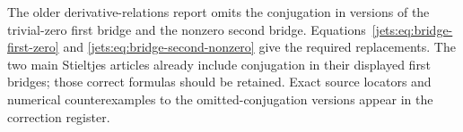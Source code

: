 \begin{remark}
The older derivative-relations report omits the conjugation
in versions of the trivial-zero first bridge and the nonzero
second bridge. Equations~\eqref{jets:eq:bridge-first-zero} and
\eqref{jets:eq:bridge-second-nonzero} give the required replacements.
The two main Stieltjes articles already include conjugation
in their displayed first bridges; those correct formulas
should be retained. Exact source locators and numerical
counterexamples to the omitted-conjugation versions appear
in the correction register.
\end{remark}
